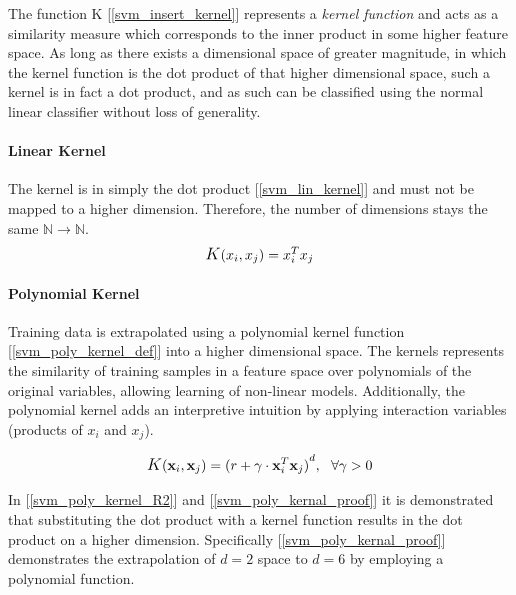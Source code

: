 	The function K [\ref{svm_insert_kernel}] represents a \textit{kernel function} and acts as a similarity measure which corresponds to the inner product in some higher feature space. As long as there exists a dimensional space of greater magnitude, in which the kernel function is the dot product of that higher dimensional space, such a kernel is in fact a dot product, and as such can be classified using the normal linear classifier without loss of generality.
	
	\par	
\paragraph{Linear Kernel}
	The kernel is in simply the dot product [\ref{svm_lin_kernel}] and must not be mapped to a higher dimension. Therefore, the number of dimensions stays the same $ \mathbb{N} \rightarrow \mathbb{N} $.
	\begin{equation}
		\mathlarger{K}(x_i,x_j) = x_i^T x_j
		\label{svm_lin_kernel}
	\end{equation}

\paragraph{Polynomial Kernel}
	Training data is extrapolated using a polynomial kernel function [\ref{svm_poly_kernel_def}] into a higher dimensional space. The kernels represents the similarity of training samples in a feature space over polynomials of the original variables, allowing learning of non-linear models. Additionally, the polynomial kernel adds an interpretive intuition by applying interaction variables (products of $ x_i $ and $ x_j $).
	
	\begin{equation}
		\begin{aligned}
			\mathlarger{K}(\textbf{x}_i,\textbf{x}_j) = {(r + \gamma \cdot \textbf{x}_i^T \textbf{x}_j)}^d, \ \ \forall \gamma > 0 
		\end{aligned}
	\label{svm_poly_kernel_def}
	\end{equation}
	
	In [\ref{svm_poly_kernel_R2}] and [\ref{svm_poly_kernal_proof}] it is demonstrated that substituting the dot product with a kernel function results in the dot product on a higher dimension. Specifically [\ref{svm_poly_kernal_proof}] demonstrates the extrapolation of $ d=2 $ space to $ d=6 $ by employing a polynomial function.
	
